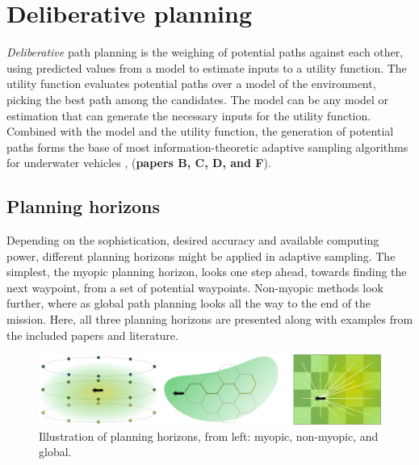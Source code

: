 \section{Deliberative planning}
\textit{Deliberative} path planning is the weighing of potential paths against each other, using predicted values from a model to estimate inputs to a utility function. The utility function evaluates potential paths over a model of the environment, picking the best path among the candidates. The model can be any model or estimation that can generate the necessary inputs for the utility function. Combined with the model and the utility function, the generation of potential paths forms the base of most information-theoretic adaptive sampling algorithms for underwater vehicles \cite{low2009multi,kemna2016adaptive,fossum2019adaptive,berget2022adaptive}, (\textbf{papers B, C, D, and F}). 

\subsection{Planning horizons}
Depending on the sophistication, desired accuracy and available computing power, different planning horizons might be applied in adaptive sampling. The simplest, the myopic planning horizon, looks one step ahead, towards finding the next waypoint, from a set of potential waypoints. Non-myopic methods look further, where as global path planning looks all the way to the end of the mission. Here, all three planning horizons are presented along with examples from the included papers and literature. 

\begin{figure}
    \centering
    \includegraphics[width= \textwidth]{figures/paths.png}
    \caption{Illustration of planning horizons, from left: myopic, non-myopic, and global.}
    \label{fig:planning}
\end{figure}


